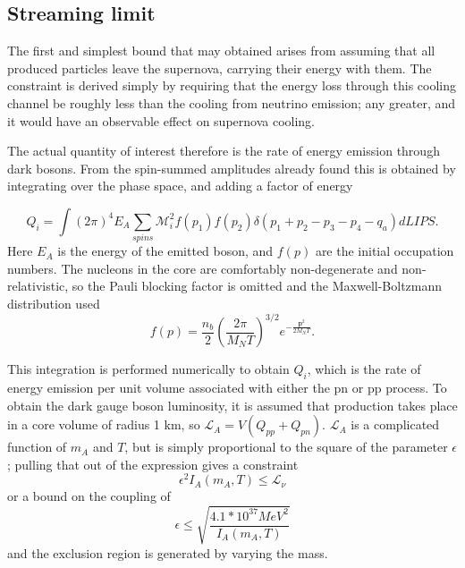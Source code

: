 \documentclass[nofootinbib,aps,prd,preprint,superscriptaddress]{revtex4}
\newcommand{\beq}{\begin{equation}}
\newcommand{\eeq}{\end{equation}}
\begin{document}
	\subsection{Streaming limit}
	The first and simplest bound that may obtained arises from assuming that all produced particles leave the supernova, carrying their energy with them. The constraint is derived simply by requiring that the energy loss through this cooling channel be roughly less than the cooling from neutrino emission; any greater, and it would have an observable effect on supernova cooling.

	The actual quantity of interest therefore is the rate of energy emission through dark bosons. From the spin-summed amplitudes already found this is obtained by integrating over the phase space, and adding a factor of energy

\beq
Q_i = \int (2\pi)^4 E_A \sum_{spins} \mathcal{M}^2_i f(p_1) f(p_2)\delta(p_1+p_2-p_3-p_4-q_a) dLIPS.
\eeq
Here $ E_A $ is the energy of the emitted boson, and $ f(p) $ are the initial occupation numbers. The nucleons in the core are comfortably non-degenerate and non-relativistic, so  the Pauli blocking factor is omitted and the Maxwell-Boltzmann distribution used  
\beq
	f(p) =  \frac{n_b}{2} (\frac{2 \pi}{M_N T})^{3/2} e^{-\frac{\textbf{p}^2} {2 M_N T}}.
\eeq
	
This integration is performed numerically to obtain $ Q_i $, which is the rate of energy emission per unit volume associated with either the pn or pp process. To obtain the dark gauge boson luminosity, it is assumed that production takes place in a core volume of radius 1 km, so $ \mathcal{L}_A = V(Q_{pp} + Q_{pn}) $. $ \mathcal{L}_A $ is a complicated function of $ m_A $ and $ T $, but is simply proportional to the square of the parameter $ \epsilon $; pulling that out of the expression gives a constraint 
\beq
\epsilon^2 I_A(m_A, T) \le \mathcal{L}_\nu
\eeq
or a bound on the coupling of 
\beq 
\epsilon \le \sqrt{\frac{4.1 * 10^{37} MeV^2}{I_A(m_A, T)}} 
\eeq 
and the exclusion region is generated by varying the mass. 
\end{document}
